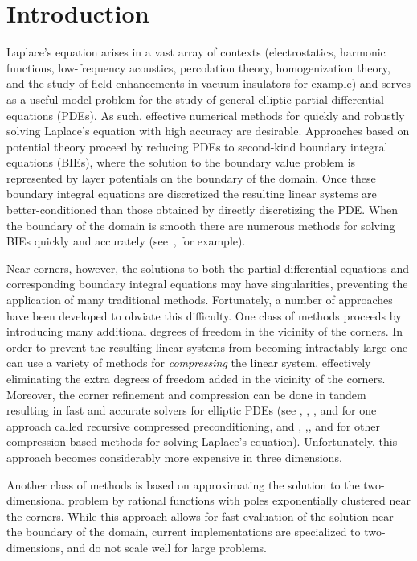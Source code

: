 \section{Introduction}
Laplace's equation arises in a vast array of contexts (electrostatics, harmonic functions, low-frequency acoustics, percolation theory, homogenization theory, and the study of field enhancements in vacuum insulators for example) and serves as a useful model problem for the study of general elliptic partial differential equations (PDEs). As such, effective numerical methods for quickly and robustly solving Laplace's equation with high accuracy are desirable. Approaches based on potential theory proceed by reducing PDEs to second-kind boundary integral equations (BIEs), where the solution to the boundary value problem is represented by layer potentials on the boundary of the domain. Once these boundary integral equations are discretized the resulting linear systems are better-conditioned than those obtained by directly discretizing the PDE. When the boundary of the domain is smooth there are numerous methods for solving BIEs quickly and accurately (see~\cite{hao}, for example). 

Near corners, however, the solutions to both the partial differential equations and corresponding boundary integral equations may have singularities, preventing the application of many traditional methods. Fortunately, a number of approaches have been developed to obviate this difficulty. One class of methods proceeds by introducing many additional degrees of freedom in the vicinity of the corners. In order to prevent the resulting linear systems from becoming intractably large one can use a variety of methods for {\it compressing} the linear system, effectively eliminating the extra degrees of freedom added in the vicinity of the corners. Moreover, the corner refinement and compression can be done in tandem resulting in fast and accurate solvers for elliptic PDEs (see \cite{helsing}, \cite{helsing2},  \cite{ojala}, \cite{helsjcp} and \cite{helsinv}  for  one approach called recursive compressed preconditioning, and  \cite{gillman}, \cite{bremer},\cite{bremer2}, and \cite{bremer3}  for other compression-based methods for solving Laplace's equation). Unfortunately, this approach becomes considerably more expensive in three dimensions. 

 Another class of methods is based on approximating the solution to the two-dimensional problem by rational functions \cite{gopal2019solving} with poles exponentially clustered near the corners. While this approach allows for fast evaluation of the solution near the boundary of the domain, current implementations are specialized to two-dimensions, and do not scale well  for large problems.
 
